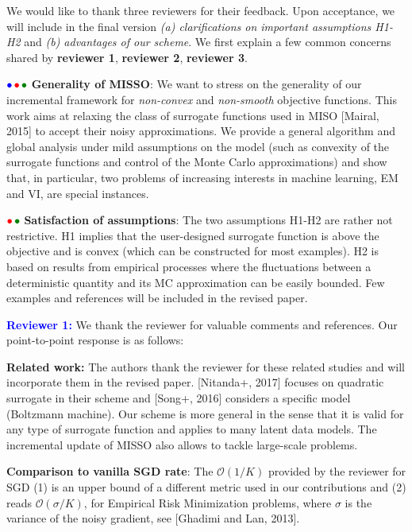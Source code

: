 \documentclass{article}
\begin{document}
We would like to thank three reviewers for their feedback. Upon acceptance, we will include in the final version \emph{{\sf (a)} clarifications on important assumptions H1-H2} and \emph{(b) advantages of our scheme}. We first explain a few common concerns shared by \textbf{\color{blue} reviewer 1}, \textbf{\color{red} reviewer 2}, \textbf{\color{green!50!black}reviewer 3}.

${\color{blue}\bullet}\!~{\color{red}\bullet}\!~{\color{green!50!black}\bullet}$ \textbf{Generality of MISSO}: We want to stress on the generality of our incremental framework for \emph{non-convex} and \emph{non-smooth} objective functions.
This work aims at relaxing the class of surrogate functions used in MISO [Mairal, 2015] to accept their noisy approximations.
We provide a general algorithm and global analysis under mild assumptions on the model (such as convexity of the surrogate functions and control of the Monte Carlo approximations) and show that, in particular, two problems of increasing interests in machine learning, EM and VI, are special instances.

${\color{red}\bullet}\!~{\color{green!50!black}\bullet}$ \textbf{Satisfaction of assumptions}:  The two assumptions H1-H2 are rather not restrictive. H1 implies that the user-designed surrogate function is above the objective and is convex (which can be constructed for most examples). H2 is based on results from empirical processes where the fluctuations between a deterministic quantity and its MC approximation can be easily bounded. Few examples and references will be included in the revised paper.

\textbf{\textcolor{blue}{Reviewer 1:}} We thank the reviewer for valuable comments and references. Our point-to-point response is as follows:

\textbf{Related work:} The authors thank the reviewer for these related studies and will incorporate them in the revised paper. 
[Nitanda+, 2017] focuses on quadratic surrogate in their scheme and [Song+, 2016] considers a specific model (Boltzmann machine). Our scheme is more general in the sense that it is valid for any type of surrogate function and applies to many latent data models.
The incremental update of MISSO also allows to tackle large-scale problems.

\textbf{Comparison to vanilla SGD rate}: The $\mathcal{O}(1/K)$ provided by the reviewer for SGD (1) is an upper bound of a different metric used in our contributions and (2) reads $\mathcal{O}(\sigma/K)$, for Empirical Risk Minimization problems, where $\sigma$ is the variance of the noisy gradient, see [Ghadimi and Lan, 2013].
\end{document}
